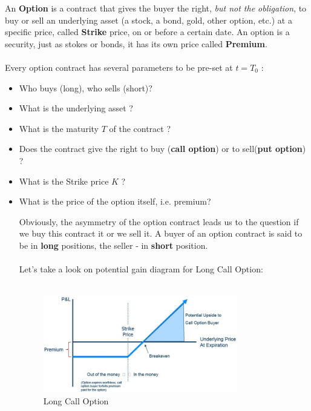 \documentclass[a4paper]{report}
\begin{document}
An \textbf {Option} is a contract that gives the buyer the right,\textit{  but not the obligation}, to buy or sell an underlying asset (a stock, a bond, gold, other option, etc.) at a specific price, called \textbf{ Strike} price, on or before a certain date. An option is a security, just as stokes or bonds, it has its own price called \textbf {Premium}.
\\
\\
Every option contract has several parameters to
be pre-set at $t=T_0$ :
\begin{itemize}
\item Who buys (long), who sells (short)?
\item What is the underlying asset ?
\item What is the maturity $T$ of the contract ?
\item Does the contract give the right to buy (\textbf{call option}) or to sell(\textbf{put option}) ?
\item What is the Strike price $K$ ?
\item What is the price of the option itself, i.e. premium?

Obviously, the asymmetry of the option contract leads us to the question if we buy this contract it or we sell it. A buyer of an option contract is said to be in \textbf{long} positions, the seller - in \textbf{short} position.
\\
\\
Let's take a look on potential gain diagram for Long Call Option:
\\
\\
\begin{figure}[H]
    \centering
    \includegraphics[width=0.8\textwidth]{payoff.png}
    \caption{Long Call Option}
\end{figure}



\end{itemize}
\end{document}
